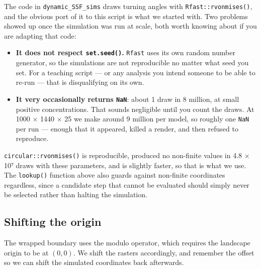 \documentclass[
  letterpaper,
  DIV=11,
  numbers=noendperiod]{scrartcl}
\providecommand{\tightlist}{%
  \setlength{\itemsep}{0pt}\setlength{\parskip}{0pt}}
\begin{document}
\begin{tcolorbox}[enhanced jigsaw, arc=.35mm, bottomrule=.15mm, bottomtitle=1mm, breakable, colback=white, colbacktitle=quarto-callout-warning-color!10!white, colframe=quarto-callout-warning-color-frame, coltitle=black, left=2mm, leftrule=.75mm, opacityback=0, opacitybacktitle=0.6, rightrule=.15mm, title=\textcolor{quarto-callout-warning-color}{\faExclamationTriangle}\hspace{0.5em}{A note on \texttt{Rfast::rvonmises}}, titlerule=0mm, toprule=.15mm, toptitle=1mm]

The code in \texttt{dynamic\_SSF\_sims} draws turning angles with
\texttt{Rfast::rvonmises()}, and the obvious port of it to this script
is what we started with. Two problems showed up once the simulation was
run at scale, both worth knowing about if you are adapting that code:

\begin{itemize}
\tightlist
\item
  \textbf{It does not respect \texttt{set.seed()}.} \texttt{Rfast} uses
  its own random number generator, so the simulations are not
  reproducible no matter what seed you set. For a teaching script --- or
  any analysis you intend someone to be able to re-run --- that is
  disqualifying on its own.
\item
  \textbf{It very occasionally returns \texttt{NaN}}: about 1 draw in 8
  million, at small positive concentrations. That sounds negligible
  until you count the draws. At 1000 × 1440 × 25 we make around 9
  million per model, so roughly one \texttt{NaN} per run --- enough that
  it appeared, killed a render, and then refused to reproduce.
\end{itemize}

\texttt{circular::rvonmises()} is reproducible, produced no non-finite
values in 4.8 × 10⁷ draws with these parameters, and is slightly faster,
so that is what we use. The \texttt{lookup()} function above also guards
against non-finite coordinates regardless, since a candidate step that
cannot be evaluated should simply never be selected rather than halting
the simulation.

\end{tcolorbox}

\subsection{Shifting the origin}\label{shifting-the-origin}

The wrapped boundary uses the modulo operator, which requires the
landscape origin to be at \((0,0)\). We shift the rasters accordingly,
and remember the offset so we can shift the simulated coordinates back
afterwards.
\end{document}
